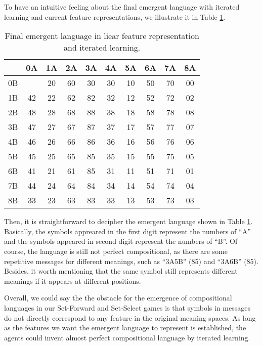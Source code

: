 To have an intuitive feeling about the final emergent language with iterated learning and current feature representations, we illustrate it in Table \ref{tab4.6:emregent_language_referential_perfect}. 

\begin{table}[!h]
    \centering
    \begin{tabular}{|c|c|c|c|c|c|c|c|c|c|}
        \hline
           & 0A & 1A & 2A & 3A & 4A & 5A & 6A & 7A & 8A \\ \hline
        0B &    & 20 & 60 & 30 & 30 & 10 & 50 & 70 & 00 \\ \hline
        1B & 42 & 22 & 62 & 82 & 32 & 12 & 52 & 72 & 02 \\ \hline
        2B & 48 & 28 & 68 & 88 & 38 & 18 & 58 & 78 & 08 \\ \hline
        3B & 47 & 27 & 67 & 87 & 37 & 17 & 57 & 77 & 07 \\ \hline
        4B & 46 & 26 & 66 & 86 & 36 & 16 & 56 & 76 & 06 \\ \hline
        5B & 45 & 25 & 65 & 85 & 35 & 15 & 55 & 75 & 05 \\ \hline
        6B & 41 & 21 & 61 & 85 & 31 & 11 & 51 & 71 & 01 \\ \hline
        7B & 44 & 24 & 64 & 84 & 34 & 14 & 54 & 74 & 04 \\ \hline
        8B & 33 & 23 & 63 & 83 & 33 & 13 & 53 & 73 & 03 \\ \hline
        \end{tabular}
    \caption{Final emergent language in liear feature representation and iterated learning.}
    \label{tab4.6:emregent_language_referential_perfect}
\end{table}

Then, it is straightforward to decipher the emergent language shown in Table \ref{tab4.6:emregent_language_referential_perfect}. Basically, the symbols appreared in the first digit represent the numbers of ``A'' and the symbols appeared in second digit represent the numbers of ``B''. Of course, the language is still not perfect compositional, as there are some repetitive messages for different meanings, such as ``3A5B'' (85) and ``3A6B'' (85). Besides, it worth mentioning that the same symbol still represents different meanings if it appears at different positions.

Overall, we could say the the obstacle for the emergence of compositional languages in our Set-Forward and Set-Select games is that symbols in messages do not directly correspond to any feature in the original meaning spaces. As long as the features we want the emergent language to represent is established, the agents could invent almost perfect compositional language by iterated learning.

